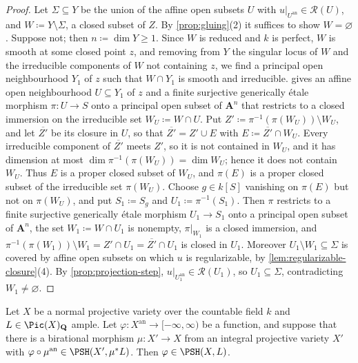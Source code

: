 \documentclass[11pt,a4paper]{article}
\newcommand{\an}{\mathrm{an}}          %
\begin{document}
\begin{proof}
Let $\Sigma\subseteq Y$ be the union of the affine open subsets $U$ with $u|_{U^{\an}}\in\mathcal{R}(U)$, and $W\coloneqq Y\setminus\Sigma$, a closed subset of $Z$. By \cref{prop:gluing}(2) it suffices to show $W=\varnothing$. Suppose not; then $n\coloneqq\dim Y\ge1$. Since $W$ is reduced and $k$ is perfect, $W$ is smooth at some closed point $z$, and removing from $Y$ the singular locus of $W$ and the irreducible components of $W$ not containing $z$, we find a principal open neighbourhood $Y_1$ of $z$ such that $W\cap Y_1$ is smooth and irreducible.  gives an affine open neighbourhood $U\subseteq Y_1$ of $z$ and a finite surjective generically \'etale morphism $\pi\colon U\to S$ onto a principal open subset of $\mathbf A^n$ that restricts to a closed immersion on the irreducible set $W_U\coloneqq W\cap U$. Put $Z'\coloneqq\pi^{-1}(\pi(W_U))\setminus W_U$, and let $\overline{Z'}$ be its closure in $U$, so that $\overline{Z'}=Z'\cup E$ with $E\coloneqq\overline{Z'}\cap W_U$. Every irreducible component of $\overline{Z'}$ meets $Z'$, so it is not contained in $W_U$, and it has dimension at most $\dim\pi^{-1}(\pi(W_U))=\dim W_U$; hence it does not contain $W_U$. Thus $E$ is a proper closed subset of $W_U$, and $\pi(E)$ is a proper closed subset of the irreducible set $\pi(W_U)$. Choose $g\in k[S]$ vanishing on $\pi(E)$ but not on $\pi(W_U)$, and put $S_1\coloneqq S_g$ and $U_1\coloneqq\pi^{-1}(S_1)$. Then $\pi$ restricts to a finite surjective generically \'etale morphism $U_1\to S_1$ onto a principal open subset of $\mathbf A^n$, the set $W_1\coloneqq W\cap U_1$ is nonempty, $\pi|_{W_1}$ is a closed immersion, and $\pi^{-1}(\pi(W_1))\setminus W_1=Z'\cap U_1=\overline{Z'}\cap U_1$ is closed in $U_1$. Moreover $U_1\setminus W_1\subseteq\Sigma$ is covered by affine open subsets on which $u$ is regularizable, by \cref{lem:regularizable-closure}(4). By \cref{prop:projection-step}, $u|_{U_1^{\an}}\in\mathcal{R}(U_1)$, so $U_1\subseteq\Sigma$, contradicting $W_1\ne\varnothing$.
\end{proof}

\begin{corollary}\label{cor:normal-weak-global}
Let $X$ be a normal projective variety over the countable field $k$ and $L\in\Pic(X)_{\mathbf Q}$ ample. Let $\varphi\colon X^{\an}\to[-\infty,\infty)$ be a function, and suppose that there is a birational morphism $\mu\colon X'\to X$ from an integral projective variety $X'$ with $\varphi\circ\mu^{\an}\in\PSH(X',\mu^*L)$. Then $\varphi\in\PSH(X,L)$.
\end{corollary}
\end{document}
